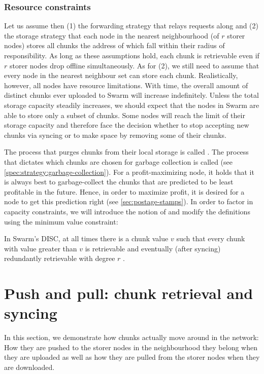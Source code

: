 \subsubsection{Resource constraints}

Let us assume then (1) the forwarding strategy that relays requests along  and (2) the storage strategy that each node in the nearest neighbourhood (of $r$ storer nodes) stores all chunks the address of which fall within their radius of responsibility. As long as these assumptions hold, each chunk is retrievable even if $r$ storer nodes drop offline simultaneously. As for (2), we still need to assume that every node in the nearest neighbour set can store each chunk. Realistically, however, all nodes have resource limitations. With time, the overall amount of distinct chunks ever uploaded to Swarm will increase indefinitely. Unless the total storage capacity steadily increases, we should expect that the nodes in Swarm are able to store only a subset of chunks. Some nodes will reach the limit of their storage capacity and therefore face the decision whether to stop accepting new chunks via syncing or to make space by removing some of their chunks. 

The process that purges chunks from their local storage is called . The process that dictates which chunks are chosen for garbage collection is called  (see  \ref{spec:strategy:garbage-collection}). For a profit-maximizing node, it holds that it is always best to garbage-collect the chunks that are predicted to be least profitable in the future. Hence, in order to maximize profit, it is desired for a node to get this prediction right (see \ref{sec:postage-stamps}). In order to factor in capacity constraints, we will introduce the notion of  and modify the definitions using the minimum value constraint:

In Swarm's DISC, at all times there is a chunk value $v$ such that every chunk with value greater than $v$ is retrievable and eventually (after syncing) redundantly retrievable with degree $r$ .


\section{Push and pull: chunk retrieval and syncing}\label{sec:push-and-pull}
\green{}
In this section, we demonstrate how chunks actually move around in the network: How they are pushed to the storer nodes in the neighbourhood they belong when they are uploaded as well as how they are pulled from the storer nodes when they are downloaded.

